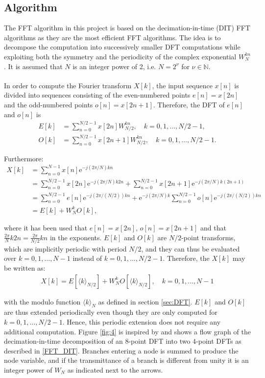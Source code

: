 \subsection{Algorithm}
The FFT algorithm in this project is based on the decimation-in-time (DIT) FFT algorithms as they are the most efficient FFT algorithms. The idea is to decompose the computation into successively smaller DFT computations while exploiting both the symmetry and the periodicity of the complex exponential $W_N^{kn}$ \cite{page 755, DTSP}. It is assumed that $N$ is an integer power of 2, i.e. $N = 2^\nu$ for $\nu \in \mathbb{N}$.
\\ \\
In order to compute the Fourier transform $X[k]$, the input sequence $x[n]$ is divided into sequences consisting of the even-numbered points $e[n] = x[2n]$ and the odd-numbered points $o[n] = x[2n+1]$. Therefore, the DFT of $e[n]$ and $o[n]$ is
\begin{align*}
E[k] &= \sum_{n=0}^{N/2-1} x[2n] W_{N/2}^{kn}, \quad k = 0, 1, \dots, N/2-1, \\
O[k] &= \sum_{n=0}^{N/2-1} x[2n+1] W_{N/2}^{kn}, \quad k = 0, 1, \dots, N/2-1.
\end{align*}

Furthermore:
\begin{align}
X[k] &= \sum_{n=0}^{N-1} x[n] \text{e}^{-j(2\pi/N)kn} \nonumber \\
&= \sum_{n=0}^{N/2-1} x[2n] \text{e}^{-j(2\pi/N)k2n} + \sum_{n=0}^{N/2-1} x[2n+1] \text{e}^{-j(2\pi/N)k(2n+1)} \nonumber \\
&= \sum_{n=0}^{N/2-1} e[n] \text{e}^{-j(2\pi/(N/2))kn} + \text{e}^{-j(2\pi/N)k} \sum_{n=0}^{N/2-1} o[n] \text{e}^{-j(2\pi/(N/2))kn} \nonumber \\
&= E[k] + W_N^k O[k], \label{FFT_DIT}
\end{align}

where it has been used that $e[n] = x[2n]$, $o[n] = x[2n+1]$ and that $\frac{2\pi}{N} k2n = \frac{2\pi}{N/2} kn$ in the exponents. $E[k]$ and $O[k]$ are $N/2$-point transforms, which are implicitly periodic with period $N/2$, and they can thus be evaluated over $k = 0, 1, \dots, N-1$ instead of $k = 0, 1, \dots, N/2-1$. Therefore, the $X[k]$ may be written as:
\begin{align} \label{FFT_modulo}
X[k] = E[\langle k\rangle_{N/2}] + W_N^k O[\langle k\rangle_{N/2}], \quad k = 0, 1, \dots, N-1
\end{align}

with the modulo function $\langle k \rangle_N$ as defined in section \ref{sec:DFT}. $E[k]$ and $O[k]$ are thus extended periodically even though they are only computed for $k = 0, 1, \dots, N/2-1$. Hence, this periodic extension does not require any additional computation. Figure \ref{fig:4} is inspired by \cite{figure 4, DTSP} and shows a flow graph of the decimation-in-time decomposition of an $8$-point DFT into two $4$-point DFTs as described in \eqref{FFT_DIT}. Branches entering a node is summed to produce the node variable, and if the transmittance of a branch is different from unity it is an integer power of $W_N$ as indicated next to the arrows.

